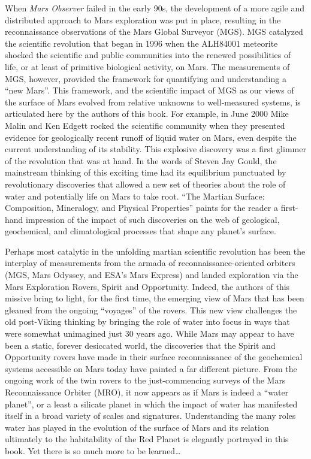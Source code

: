 \begin{foreword}
When {\it Mars Observer} failed in the early 90s, the development of a more agile and distributed approach to Mars exploration was put in place, resulting in the reconnaissance observations of the Mars Global Surveyor (MGS). MGS catalyzed the scientific revolution that began in 1996 when the ALH84001 meteorite shocked the scientific and public communities into the renewed possibilities of life, or at least of primitive biological activity, on Mars. The measurements of MGS, however, provided the framework for quantifying and understanding a ``new Mars''. This framework, and the scientific impact of MGS as our views of the surface of Mars evolved from relative unknowns to well-measured systems, is articulated here by the authors of this book. For example, in June 2000 Mike Malin and Ken Edgett rocked the scientific community when they presented evidence for geologically recent runoff of liquid water on Mars, even despite the current understanding of its stability. This explosive discovery was a first glimmer of the revolution that was at hand. In the words of Steven Jay Gould, the mainstream thinking of this exciting time had its equilibrium punctuated by revolutionary discoveries that allowed a new set of theories about the role of water and potentially life on Mars to take root. ``The Martian Surface: Composition, Mineralogy, and Physical Properties'' paints for the reader a first-hand impression of the impact of such discoveries on the web of geological, geochemical, and climatological processes that shape any planet's surface.

Perhaps most catalytic in the unfolding martian scientific revolution has been the interplay of measurements from the armada of reconnaissance-oriented orbiters (MGS, Mars Odyssey, and ESA's Mars Express) and landed exploration via the Mars Exploration Rovers, Spirit and Opportunity. Indeed, the authors of this missive bring to light, for the first time, the emerging view of Mars that has been gleaned from the ongoing ``voyages'' of the rovers. This new view challenges the old post-Viking thinking by bringing the role of water into focus in ways that were somewhat unimagined just 30 years ago. While Mars may appear to have been a static, forever desiccated world, the discoveries that the Spirit and Opportunity rovers have made in their surface reconnaissance of the geochemical systems accessible on Mars today have painted a far different picture. From the ongoing work of the twin rovers to the just-commencing surveys of the Mars Reconnaissance Orbiter (MRO), it now appears as if Mars is indeed a ``water planet'', or a least a silicate planet in which the impact of water has manifested itself in a broad variety of scales and signatures. Understanding the many roles water has played in the evolution of the surface of Mars and its relation ultimately to the habitability of the Red Planet is elegantly portrayed in this book. Yet there is so much more to be learned\ldots


\end{foreword}
